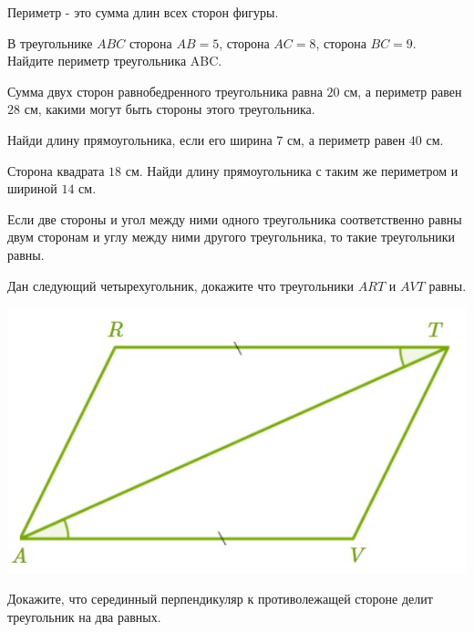 \begin{class}[number=5]
	\begin{listofex}
		\item 
		\begin{definit}
			Периметр - это сумма длин всех сторон фигуры.
		\end{definit}
		\item В треугольнике \(ABC\) сторона \(AB = 5\), сторона \(AC = 8\), сторона \(BC = 9\). Найдите периметр треугольника ABC.
		\item Сумма двух сторон равнобедренного треугольника равна \( 20 \) см, а периметр равен \( 28 \) см, какими могут быть стороны этого треугольника.
		\item Найди длину прямоугольника, если его ширина \(7\) см, а периметр равен \(40\) см.
		\item Сторона квадрата \(18\) см. Найди длину прямоугольника с таким же периметром и шириной \(14\) см.
		\item 
		\begin{definit}
			Если две стороны и угол между ними одного треугольника соответственно равны двум сторонам и углу между ними другого треугольника, то такие треугольники равны.
		\end{definit}
		\item
		\begin{minipage}[t]{0.65\textwidth}
			Дан следующий четырехугольник, докажите что треугольники \(ART\) и \(AVT\) равны.
		\end{minipage}
		\begin{minipage}[c]{0.33\textwidth}
			\includegraphics[align=t, width=\textwidth]{pics/G71M4C5-3.jpg}
		\end{minipage}
		\item Докажите, что серединный перпендикуляр к противолежащей стороне делит треугольник на два равных.

\end{listofex}
\end{class}
